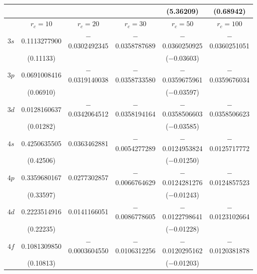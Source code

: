 \begin{table}[!bt]
\begin{tabular}{c | c | c | c | c | c}
			 		 &               &                 &                  & (5.36209)         & (0.68942)         \\ 
		\hline
					 & $r_c=10$       &   $r_c=20$      &     $r_c=30$     &   $r_c=50$       &  $r_c=100$        \\
		\hline
		$3s$   & 0.1113277900   & $-$0.0302492345 & $-$0.0358787689  & $-$0.0360250925  & $-$0.0360251051   \\
					 & (0.11133)      &                 &                  & ($-$0.03603)     &                   \\
		$3p$   & 0.0691008416   & $-$0.0319140038 & $-$0.0358733580  & $-$0.0359675961  & $-$0.0359676034   \\
					 & (0.06910)      &                 &                  & ($-$0.03597)     &                   \\
		$3d$   & 0.0128160637   & $-$0.0342064512 & $-$0.0358194164  & $-$0.0358506603  & $-$0.0358506623   \\
					 & (0.01282)      &                 &                  & ($-$0.03585)     &                   \\
		$4s$   & 0.4250635505   & 0.0363462881    & $-$0.0054277289  & $-$0.0124953824  & $-$0.0125717772   \\
					 & (0.42506)      &                 &                  & ($-$0.01250)     &                   \\
		$4p$   & 0.3359680167   & 0.0277302857    & $-$0.0066764629  & $-$0.0124281276  & $-$0.0124857523   \\
					 & (0.33597)      &                 &                  & ($-$0.01243)     &                   \\
		$4d$   & 0.2223514916   & 0.0141166051    & $-$0.0086778605  & $-$0.0122798641  & $-$0.0123102664   \\
					 & (0.22235)      &                 &                  & ($-$0.01228)     &                   \\
		$4f$   & 0.1081309850   & $-$0.0003604550 & $-$0.0106312256  & $-$0.0120295162  & $-$0.0120381878   \\
					 & (0.10813)      &                 &                  & ($-$0.01203)     &                   \\
		\hline	
		\hline		
	\end{tabular}
			
\end{table}


%
%

















